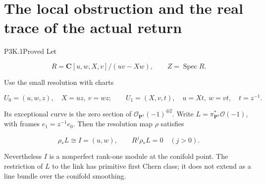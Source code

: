\section{The local obstruction and the real trace of the actual return}

\begin{statement}{P3K.1}{Proved}
Let

\[
 R=\mathbf C[u,w,X,v]/(uv-Xw),\qquad Z=\operatorname{Spec}R.
\]

Use the small resolution with charts

\[
 U_0=(u,w,z),\quad X=uz,\ v=wz;
 \qquad U_1=(X,v,t),\quad u=Xt,\ w=vt,\quad t=z^{-1}.
\]

Its exceptional curve is the zero section of
\(\mathcal O_{\mathbf P^1}(-1)^{\oplus2}\).  Write
\(L=\pi_{\mathbf P^1}^*\mathcal O(-1)\), with frames
\(e_1=z^{-1}e_0\).  Then the resolution map \(\rho\) satisfies

\[
 \rho_*L\cong I=(u,w),\qquad R^j\rho_*L=0\quad(j>0).
\]

Nevertheless \(I\) is a nonperfect rank-one module at the conifold
point.  The restriction of \(L\) to the link has primitive first Chern
class; it does not extend as a line bundle over the conifold smoothing.
\end{statement}

